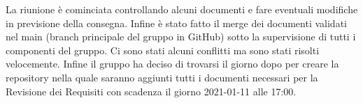 La riunione è cominciata controllando alcuni documenti e fare eventuali modifiche in previsione della consegna. Infine \`{e} stato fatto il merge dei documenti validati nel main (branch principale del gruppo in GitHub) sotto la supervisione di tutti i componenti del gruppo. Ci sono stati alcuni conflitti ma sono stati risolti velocemente. Infine il gruppo ha deciso di trovarsi il giorno dopo per creare la repository nella quale saranno aggiunti tutti i documenti necessari per la Revisione dei Requisiti con scadenza il giorno 2021-01-11 alle 17:00.
